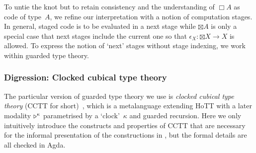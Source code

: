 \documentclass[draft,a4paper,UKenglish,numberwithinsect,cleveref,thm-restate]{lipics-v2021}
\numberwithin{equation}{section}
\theoremstyle{definition}
\theoremstyle{plain}
\begin{document}
To untie the knot but to retain consistency and the understanding of $\Box A$ as code of type~$A$, we refine our interpretation with a notion of computation stages.
In general, staged code is to be evaluated in a next stage while   $\boxtimes A$ is only a special case that next stages include the current one so that $\epsilon_X\colon {\boxtimes} X \to X$ is allowed.
To express the notion of `next' stages without stage indexing, we work within guarded type theory.

\subsubsection{Digression: Clocked cubical type theory}

The particular version of guarded type theory we use is \emph{clocked cubical type theory} (CCTT for short)~\cite{Kristensen2021}, which is a metalanguage extending HoTT with a later modality $\mathord{\triangleright}^\kappa$ parametrised by a `clock'~$\kappa$ and guarded recursion.
Here we only intuitively introduce the constructs and properties of CCTT that are necessary for the informal presentation of the constructions in , but the formal details are all checked in Agda.


\end{document}
